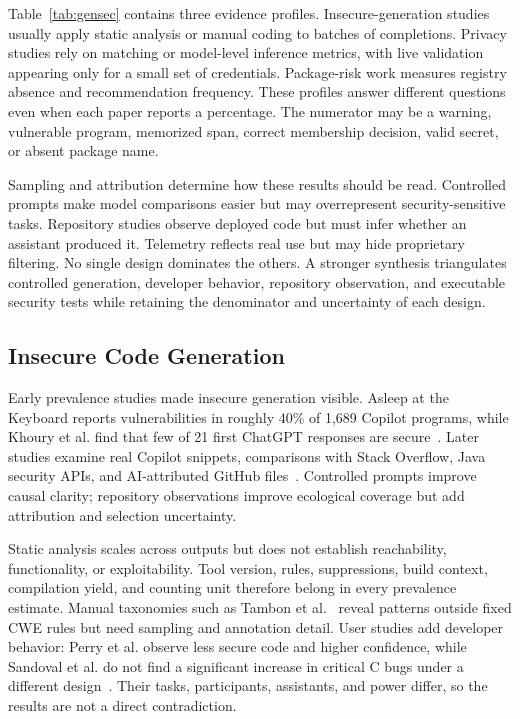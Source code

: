 \documentclass[acmsmall,screen,review]{acmart}
\begin{document}
Table~\ref{tab:gensec} contains three evidence profiles. Insecure-generation studies usually apply static analysis or manual coding to batches of completions. Privacy studies rely on matching or model-level inference metrics, with live validation appearing only for a small set of credentials. Package-risk work measures registry absence and recommendation frequency. These profiles answer different questions even when each paper reports a percentage. The numerator may be a warning, vulnerable program, memorized span, correct membership decision, valid secret, or absent package name.

Sampling and attribution determine how these results should be read. Controlled prompts make model comparisons easier but may overrepresent security-sensitive tasks. Repository studies observe deployed code but must infer whether an assistant produced it. Telemetry reflects real use but may hide proprietary filtering. No single design dominates the others. A stronger synthesis triangulates controlled generation, developer behavior, repository observation, and executable security tests while retaining the denominator and uncertainty of each design.

\subsection{Insecure Code Generation} \label{sec:gensec:insecure}
Early prevalence studies made insecure generation visible. Asleep at the Keyboard reports vulnerabilities in roughly 40\% of 1,689 Copilot programs, while Khoury et al. find that few of 21 first ChatGPT responses are secure~\cite{pearce2022asleep,khoury2023secure}. Later studies examine real Copilot snippets, comparisons with Stack Overflow, Java security APIs, and AI-attributed GitHub files~\cite{fu2023security,hamer2024copy,mousavi2024investigation,largescale2025vulnerabilities}. Controlled prompts improve causal clarity; repository observations improve ecological coverage but add attribution and selection uncertainty.

Static analysis scales across outputs but does not establish reachability, functionality, or exploitability. Tool version, rules, suppressions, build context, compilation yield, and counting unit therefore belong in every prevalence estimate. Manual taxonomies such as Tambon et al.~\cite{tambon2025bugs} reveal patterns outside fixed CWE rules but need sampling and annotation detail. User studies add developer behavior: Perry et al. observe less secure code and higher confidence, while Sandoval et al. do not find a significant increase in critical C bugs under a different design~\cite{perry2023users,sandoval2023lost}. Their tasks, participants, assistants, and power differ, so the results are not a direct contradiction.
\end{document}
